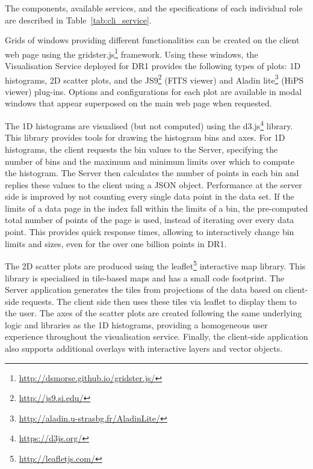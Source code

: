 \documentclass[longauth, final]{aa}
\begin{document}
The components, available services, and the specifications of each individual role are described in Table~\ref{tab:cli_service}.

Grids of windows providing different functionalities can be created on the client web page using the gridster.js\footnote{\url{http://dsmorse.github.io/gridster.js/}} framework. Using these windows, the Visualisation Service deployed for DR1 provides the following types of plots: 1D histograms, 2D scatter plots, and the JS9\footnote{\url{http://js9.si.edu/}} (FITS viewer) and Aladin lite\footnote{\url{http://aladin.u-strasbg.fr/AladinLite/}} (HiPS  viewer) plug-ins. Options and configurations for each plot are available in modal windows that appear superposed on the main web page when requested.



The 1D histograms are visualised (but not computed) using the d3.js\footnote{\url{https://d3js.org/}} library. This library provides tools for drawing the histogram bins and axes. For 1D histograms, the client requests the bin values to the Server, specifying the number of bins and the maximum and minimum limits over which to compute the histogram. The Server then calculates the number of points in each bin and replies these values to the client using a JSON object. Performance at the server side is improved by not counting every single data point in the data set. If the limits of a data page in the index fall within the limits of a bin, the pre-computed total number of points of the page is used, instead of iterating over every data point. This provides quick response times, allowing to interactively change bin limits and sizes,  even for the over one billion points in DR1. 

The 2D scatter plots are produced using the leaflet\footnote{\url{http://leafletjs.com/}} interactive map library. This library is specialised in tile-based maps and has a small code footprint. The Server application generates the tiles from projections of the data based on client-side requests. The client side then uses these tiles via leaflet to display them to the user. The axes of the scatter plots are created following the same underlying logic and libraries as the 1D histograms, providing a homogeneous user experience throughout the visualisation service. Finally, the client-side application also supports additional overlays with interactive layers and vector objects.
\end{document}
